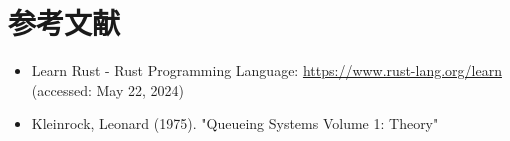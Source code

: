 \documentclass[fleqn, a4paper. 12pt]{jsarticle}
\begin{document}
  \newpage
  
  \section*{参考文献}

    \begin{itemize}
        \item Learn Rust - Rust Programming Language: \url{https://www.rust-lang.org/learn} (accessed: May 22, 2024)
    \end{itemize}

    \begin{itemize}
      \item Kleinrock, Leonard (1975). "Queueing Systems Volume 1: Theory"
    \end{itemize}
\end{document}
